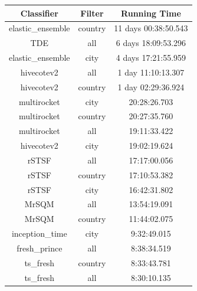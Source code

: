 \documentclass{ieeeaccess}
\begin{document}
\begin{table}[ht]
    \centering
    \begin{tabular}{|c|c|c|}
    \hline
    \textbf{Classifier}        & \textbf{Filter}   & \textbf{Running Time}          \\ \hline
    elastic\_ensemble          & country           & 11 days 00:38:50.543            \\ \hline
    TDE                       & all               & 6 days 18:09:53.296             \\ \hline
    elastic\_ensemble          & city              & 4 days 17:21:55.959             \\ \hline
    hivecotev2                & all               & 1 day 11:10:13.307              \\ \hline
    hivecotev2                & country           & 1 day 02:29:36.924              \\ \hline
    multirocket               & city              & 20:28:26.703                    \\ \hline
    multirocket               & country           & 20:27:35.760                    \\ \hline
    multirocket               & all               & 19:11:33.422                    \\ \hline
    hivecotev2                & city              & 19:02:19.624                    \\ \hline
    rSTSF                     & all               & 17:17:00.056                    \\ \hline
    rSTSF                     & country           & 17:10:53.382                    \\ \hline
    rSTSF                     & city              & 16:42:31.802                    \\ \hline
    MrSQM                     & all               & 13:54:19.091                    \\ \hline
    MrSQM                     & country           & 11:44:02.075                    \\ \hline
    inception\_time           & city              & 9:32:49.015                     \\ \hline
    fresh\_prince             & all               & 8:38:34.519                     \\ \hline
    ts\_fresh                 & country           & 8:33:43.781                     \\ \hline
    ts\_fresh                 & all               & 8:30:10.135                     \\ \hline

\end{tabular}
\end{table}
\end{document}
